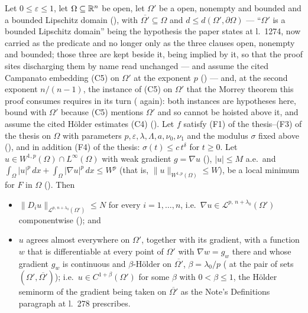 \begin{theorem}[Theorem 4]
Let $0\le\varepsilon\le1$, let $\Omega\subseteq\mathbb{R}^n$ be open, let $\Omega'$ be a
open, nonempty and bounded and a bounded Lipschitz domain
(), with $\overline{\Omega'}\subseteq\Omega$ and
$d\le d(\Omega',\partial\Omega)$ --- ``$\Omega'$ is a bounded Lipschitz domain'' being the hypothesis the paper states at l.~1274, now carried as the predicate  and no longer only as the three clauses open, nonempty and bounded; those three are kept beside it, being implied by it, so that the proof sites discharging them by name read unchanged ---
and assume the
cited Campanato embedding (C5) on $\Omega'$ at the exponent $p$
() --- and, at the second exponent
$n/(n-1)$, the instance of (C5) on $\Omega'$ that the Morrey theorem this proof
consumes requires in its turn ( again): both
instances are hypotheses here, bound with $\Omega'$ because (C5) mentions
$\Omega'$ and so cannot be hoisted above it, and assume the cited H\"older
estimates (C4) ().  Let $f$ satisfy
(F1) of the thesis--(F3) of the thesis on $\Omega$ with parameters
$p,\varepsilon,\lambda,\Lambda,a,\nu_0,\nu_1$ and the modulus $\sigma$ fixed
above (), and in addition (F4) of the thesis:
$\sigma(t)\le c\,t^{\delta}$ for $t\ge0$.  Let
$u\in W^{1,p}(\Omega)\cap L^\infty(\Omega)$ with weak gradient $g=\nabla u$
(), $|u|\le M$ a.e.\ and
$\int_\Omega|u|^p\,dx+\int_\Omega|\nabla u|^p\,dx\le W^p$ (that is,
$\|u\|_{W^{1,p}(\Omega)}\le W$), be a local minimum for $F$ in
$\Omega$ ().  Then
\begin{itemize}
\item[(i)] $\|D_iu\|_{\mathcal L^{p,\,n+\lambda_0}(\Omega')}\le N$ for every
  $i=1,\dots,n$, i.e.\ $\nabla u\in\mathcal L^{p,\,n+\lambda_0}(\Omega')$
  componentwise (); and
\item[(ii)] $u$ agrees almost everywhere on $\Omega'$, together with its
  gradient, with a function $w$ that is differentiable at every point of
  $\Omega'$ with $\nabla w=g_w$ there and whose gradient $g_w$ is continuous and
  $\beta$-H\"older on $\overline{\Omega'}$, $\beta=\lambda_0/p$
  ( at the pair of sets $(\Omega',\overline{\Omega'})$);
  i.e.\ $u\in C^{1+\beta}(\Omega')$ for some $\beta$ with $0<\beta\le1$, the
  H\"older seminorm of the gradient being taken on $\overline{\Omega'}$ as the
  Note's Definitions paragraph at l.~278 prescribes.

\end{itemize}
\end{theorem}
